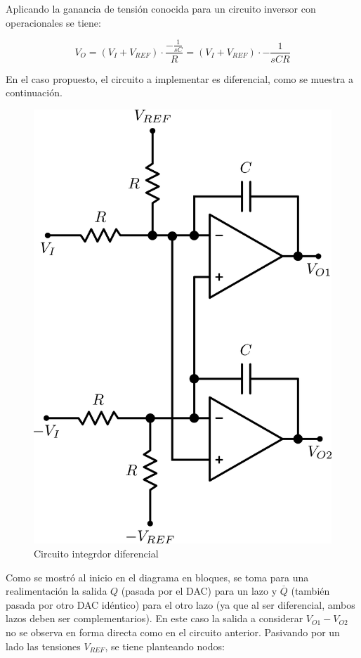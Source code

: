 \documentclass[assd_tp3_main.tex]{subfiles}
\begin{document}
Aplicando la ganancia de tensión conocida para un circuito inversor con operacionales se tiene:

\[
V_O = (V_I+V_{REF}) \cdot \frac{-\frac{1}{sC}}{R} = (V_I + V_{REF}) \cdot -\frac{1}{sCR}
\]

En el caso propuesto, el circuito a implementar es diferencial, como se muestra a continuación.

\begin{figure}[!ht]
\begin{centering}
\includegraphics[scale=0.45]{images/ej5/IntegradorDif.png}
\par\end{centering}
\caption{Circuito integrdor diferencial}
\end{figure}

Como se mostró al inicio en el diagrama en bloques, se toma para una realimentación la salida $Q$ (pasada por el DAC) para un lazo y $\overline{Q}$ (también pasada por otro DAC idéntico) para el otro lazo (ya que al ser diferencial, ambos lazos deben ser complementarios). En este caso la salida a considerar $V_{O1} - V_{O2}$ no se observa en forma directa como en el circuito anterior. Pasivando por un lado las tensiones $V_{REF}$, se tiene planteando nodos:
\end{document}
